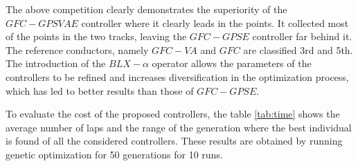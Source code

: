 \documentclass[10pt,journal,compsoc]{IEEEtran}
\begin{document}
The above competition clearly demonstrates the superiority of the $GFC-GPSVAE$ controller where it clearly leads in the points. It collected most of the points in the two tracks, leaving the $GFC-GPSE$ controller far behind it. The reference conductors, namely $GFC-VA$ and $GFC$  are classified 3rd and 5th.
The introduction of the $BLX-\alpha$ operator allows the parameters of the controllers to be refined and  increases diversification in the optimization process, which has led to better results than those of $GFC-GPSE$.

%

To evaluate the cost of the proposed controllers, the table \ref{tab:time} shows the average number of laps %
and the range of the generation where the best individual is found of all the considered controllers. These results are obtained by running genetic
optimization for 50 generations for 10 runs.  
\end{document}
